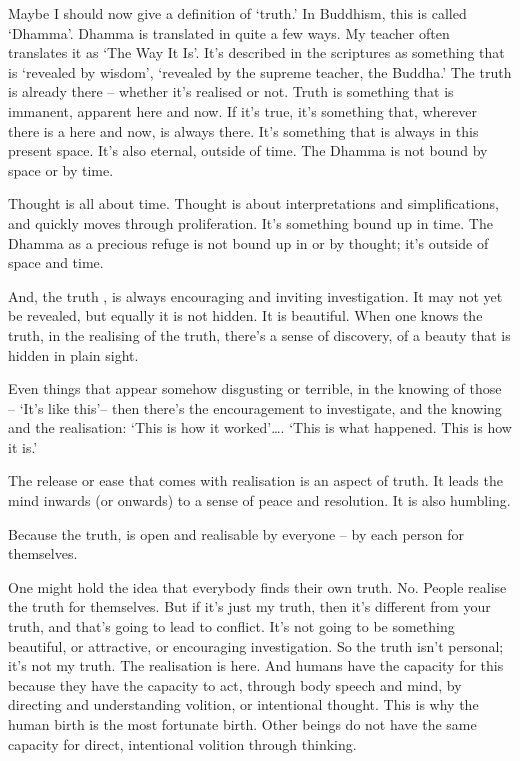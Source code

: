 Maybe I should now give a definition of `truth.' In Buddhism, this is called
`Dhamma'. Dhamma is translated in quite a few ways. My teacher often translates
it as `The Way It Is'. It's described in the scriptures as something that is
`revealed by wisdom', `revealed by the supreme teacher, the Buddha.' The truth
is already there -- whether it's realised or not. Truth is something that is
immanent, apparent here and now. If it's true, it's something that, wherever
there is a here and now, is always there. It's something that is always in this
present space. It's also eternal, outside of time. The Dhamma is not bound by
space or by time.

Thought is all about time. Thought is about interpretations and simplifications,
and quickly moves through proliferation. It's something bound up in time. The
Dhamma as a precious refuge is not bound up in or by thought; it's outside of
space and time.

And, the truth , is always encouraging and inviting investigation. It may not
yet be revealed, but equally it is not hidden. It is beautiful. When one knows
the truth, in the realising of the truth, there's a sense of discovery, of a
beauty that is hidden in plain sight.

Even things that appear somehow disgusting or terrible, in the knowing of those
-- `It's like this'-- then there's the encouragement to investigate, and the
knowing and the realisation: `This is how it worked'\ldots. `This is what
happened. This is how it is.'

The release or ease that comes with realisation is an aspect of truth. It leads
the mind inwards (or onwards) to a sense of peace and resolution. It is also
humbling.

Because the truth, is open and realisable by everyone -- by each person for
themselves.

One might hold the idea that everybody finds their own truth. No. People realise
the truth for themselves. But if it's just my truth, then it's different from
your truth, and that's going to lead to conflict. It's not going to be something
beautiful, or attractive, or encouraging investigation. So the truth isn't
personal; it's not my truth. The realisation is here. And humans have the
capacity for this because they have the capacity to act, through body speech and
mind, by directing and understanding volition, or intentional thought. This is
why the human birth is the most fortunate birth. Other beings do not have the
same capacity for direct, intentional volition through thinking.

